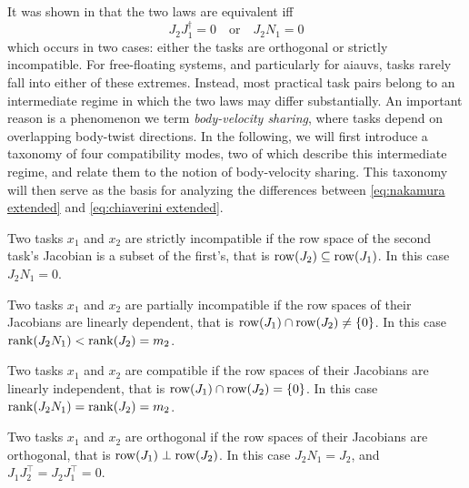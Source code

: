\documentclass[../main.tex]{subfiles}
\begin{document}

It was shown in \cite{chiaverini1997} that the two laws are equivalent iff
\[
J_2J_1^\dagger=0 \quad\text{or}\quad
J_2N_1 = 0
\]
which occurs in two cases: either the tasks are orthogonal or strictly incompatible. For free-floating systems, and particularly for \glspl{aiauv}, tasks rarely fall into either of these extremes. Instead, most practical task pairs belong to an intermediate regime in which the two laws may differ substantially. An important reason is a phenomenon we term \emph{body-velocity sharing}, where tasks depend on overlapping body-twist directions. In the following, we will first introduce a taxonomy of four compatibility modes, two of which describe this intermediate regime, and relate them to the notion of body-velocity sharing. This taxonomy will then serve as the basis for analyzing the differences between \eqref{eq:nakamura extended} and \eqref{eq:chiaverini extended}.


\begin{definition}
    Two tasks \(x_1\) and \(x_2\) are strictly incompatible if the row space of the second task's Jacobian is a subset of the first's, that is \( \operatorname{row}(J_2) \subseteq \operatorname{row}(J_1)\). In this case \( J_2 N_1 = 0\).
\end{definition}
\begin{definition}
    Two tasks \(x_1\) and \(x_2\) are partially incompatible if the row spaces of their Jacobians are linearly dependent, that is \( \operatorname{row}(J_1) \cap \operatorname{row}(J_2) \neq \{0\} \). In this case \( \operatorname{rank}(J_2 N_1) < \operatorname{rank}(J_2) = m_2\).
\end{definition}
\begin{definition}
    Two tasks \(x_1\) and \(x_2\) are compatible if the row spaces of their Jacobians are linearly independent, that is \( \operatorname{row}(J_1) \cap \operatorname{row}(J_2) = \{0\} \). In this case \( \operatorname{rank}(J_2 N_1) = \operatorname{rank}(J_2) = m_2\).
\end{definition}
\begin{definition}
    Two tasks \(x_1\) and \(x_2\) are orthogonal if the row spaces of their Jacobians are orthogonal, that is \( \operatorname{row}(J_1) \perp \operatorname{row}(J_2) \). In this case \( J_2 N_1 = J_2\), and \( J_1 J_2^\top = J_2J_1^\top = 0\).
\end{definition}
\end{document}
